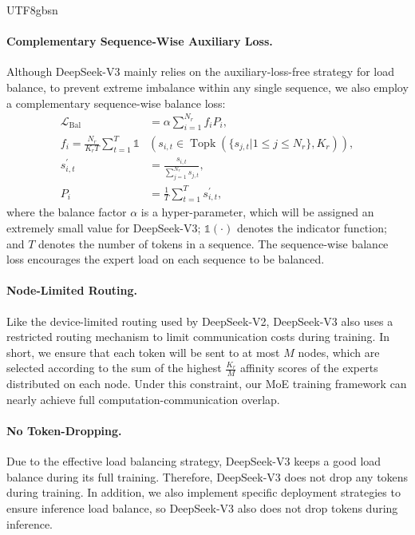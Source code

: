 \documentclass[11pt, a4paper, logo, copyright, nonumbering]{deepseek}
\newcommand{\dsvii}{DeepSeek-V2}
\newcommand{\dsviii}{DeepSeek-V3}
\renewcommand{\leq}{\leqslant}
\begin{document}
\begin{CJK*}{UTF8}{gbsn}
\paragraph{Complementary Sequence-Wise Auxiliary Loss.}
Although \dsviii{} mainly relies on the auxiliary-loss-free strategy for load balance, to prevent extreme imbalance within any single sequence, we also employ a complementary sequence-wise balance loss:
\begin{align}
    \mathcal{L}_{\mathrm{Bal}} & = \alpha \sum_{i=1}^{N_r}{f_i P_i}, \\
    f_i = \frac{N_r}{K_r T} \sum_{t=1}^{T} \mathds{1} & \left( s_{i,t} \in \operatorname{Topk} ( \{ s_{j, t} | 1 \leq j \leq N_r \}, K_{r} ) \right), \\
    s^{\prime}_{i,t} & = \frac{s_{i,t}}{\sum_{j=1}^{N_r} s_{j,t}}, \\
    P_i & = \frac{1}{T} \sum_{t=1}^{T}{s^{\prime}_{i,t}},
\end{align}
where the balance factor $\alpha$ is a hyper-parameter, which will be assigned an extremely small value for \dsviii{}; 
$\mathds{1}(\cdot)$ denotes the indicator function; 
and $T$ denotes the number of tokens in a sequence. 
The sequence-wise balance loss encourages the expert load on each sequence to be balanced. 

\paragraph{Node-Limited Routing.}
Like the device-limited routing used by \dsvii{}, \dsviii{} also uses a restricted routing mechanism to limit communication costs during training. 
In short, we ensure that each token will be sent to at most $M$ nodes, which are selected according to the sum of the highest $\frac{K_r}{M}$ affinity scores of the experts distributed on each node.
Under this constraint, our MoE training framework can nearly achieve full computation-communication overlap. 

\paragraph{No Token-Dropping.}
Due to the effective load balancing strategy, \dsviii{} keeps a good load balance during its full training. 
Therefore, \dsviii{} does not drop any tokens during training. 
In addition, we also implement specific deployment strategies to ensure inference load balance, so \dsviii{} also does not drop tokens during inference. 


\end{CJK*}
\end{document}
